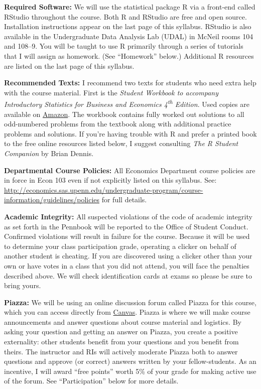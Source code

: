 \documentclass[11pt, letterpaper]{article}
\begin{document}
\noindent \textbf{Required Software:} 
We will use the statistical package R via a front-end called RStudio throughout the course. 
Both R and RStudio are free and open source. Installation instructions appear on the last page of this syllabus.
RStudio is also available in the Undergraduate Data Analysis Lab (UDAL) in McNeil rooms 104 and 108--9. 
You will be taught to use R primarily through a series of tutorials that I will assign as homework. (See ``Homework'' below.)  
Additional R resources are listed on the last page of this syllabus.

\medskip

\noindent \textbf{Recommended Texts:} 
I recommend two texts for students who need extra help with the course material. 
First is the \emph{Student Workbook to accompany Introductory Statistics for Business and Economics 4\textsuperscript{th} Edition}. 
Used copies are available on \href{http://www.amazon.com/gp/offer-listing/0471508993/sr=/qid=/ref=olp_page_2?ie=UTF8&colid=&coliid=&condition=all&me=&qid=&shipPromoFilter=0&sort=sip&sr=&startIndex=10}{Amazon}. 
The workbook contains fully worked out solutions to all odd-numbered problems from the textbook along with additional practice problems and solutions.
If you're having trouble with R and prefer a printed book to the free online resources listed below, I suggest consulting \emph{The R Student Companion} by Brian Dennis.


\newpage

\noindent \textbf{Departmental Course Policies: } 
All Economics Department course policies are in force in Econ 103 even if not explicitly listed on this syllabus. 
See: \url{http://economics.sas.upenn.edu/undergraduate-program/course-information/guidelines/policies} for full details. 


\bigskip


\noindent \textbf{Academic Integrity: } 
All suspected violations of the code of academic integrity as set forth in the Pennbook will be reported to the Office of Student Conduct. 
Confirmed violations will result in failure for the course. 
Because it will be used to determine your class participation grade, operating a clicker on behalf of another student is cheating. 
If you are discovered using a clicker other than your own or have votes in a class that you did not attend, you will face the penalties described above. 
We will check identification cards at exams so please be sure to bring yours.

\bigskip

\noindent \textbf{Piazza:} 
We will be using an online discussion forum called Piazza for this course, which you can access directly from \href{http://upenn.instructure.com}{Canvas}. 
Piazza is where we will make course announcements and answer questions about course material and logistics.
By asking your question and getting an answer on Piazza, you create a positive externality: other students benefit from your questions and you benefit from theirs. 
The instructor and RIs will actively moderate Piazza both to answer questions and approve (or correct) answers written by your fellow-students.
As an incentive, I will award ``free points'' worth 5\% of your grade for making active use of the forum. 
See ``Participation'' below for more details.
\end{document}
